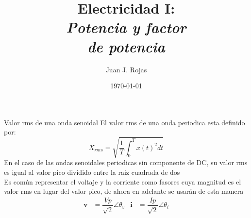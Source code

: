 \documentclass[aspectratio=169]{beamer}
\title{Electricidad I: \\ \emph{Potencia y factor}\\ \emph{de potencia}}
\author{
    Juan J. Rojas
}
\institute{Instituto Tecnológico de Costa Rica}
\date{\today}
\begin{document}

\maketitle

\begin{frame}{Valor rms de una onda senoidal}
El valor rms de una onda periodica esta definido por:\\[4pt]
    \begin{equation*}
        X_{rms} = \sqrt{\dfrac{1}{T}\int^T_0 x(t)^2dt}
    \end{equation*}
En el caso de las ondas senoidales periodicas sin componente de DC, su valor rms es igual al valor pico dividido entre la raiz cuadrada de dos\\[4pt]
Es común representar el voltaje y la corriente como fasores cuya magnitud es el valor rms en lugar del valor pico, de ahora en adelante se usarán de esta manera
    \begin{align*}
        \bm{v} &= \dfrac{Vp}{\sqrt{2}}\angle \theta_v & \bm{i} &= \dfrac{Ip}{\sqrt{2}}\angle \theta_i
    \end{align*}
\end{frame}
\end{document}
